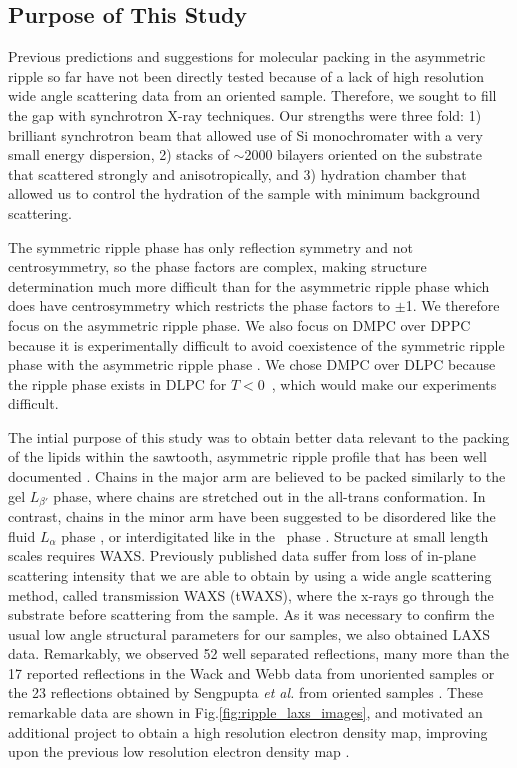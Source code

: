 \subsection{Purpose of This Study}
Previous predictions and suggestions for molecular packing in the asymmetric
ripple so far have not been directly tested because of a lack of 
high resolution wide angle scattering data from an oriented sample.
Therefore, we sought to fill the gap
with synchrotron X-ray techniques. Our strengths were three fold: 1) brilliant
synchrotron beam that allowed use of Si monochromater with a very small
energy dispersion, 2) stacks of $\sim$2000 bilayers oriented on the substrate
that scattered strongly and anisotropically, and 3) hydration chamber that 
allowed us to control the hydration of the sample with minimum background scattering.

The symmetric ripple phase has only reflection symmetry and not centrosymmetry, 
so the phase factors are complex, making structure determination much more difficult 
than for the asymmetric ripple phase which does have centrosymmetry which restricts 
the phase factors to $\pm$1. We therefore focus on the asymmetric ripple phase.  
We also focus on DMPC over DPPC because it is experimentally difficult to avoid 
coexistence of the symmetric ripple phase with the asymmetric ripple phase
\cite{ref:Katsaras00}.
We chose DMPC over DLPC because the ripple phase exists in DLPC
for $T<0$~\textcelsius, which would make our experiments difficult.

The intial purpose of this study was to obtain better data relevant
to the packing of the lipids within the sawtooth, asymmetric ripple profile 
that has been well documented \cite{ref:Sun96,ref:Sengupta03}.
Chains in the major arm are believed to be packed similarly to the gel $L_{\beta'}$ phase,
where chains are stretched out in the all-trans conformation. 
In contrast, chains in the minor arm have been suggested to be disordered
like the fluid $L_\alpha$ phase \cite{ref:Wittebort81,ref:Schneider83,ref:Cunningham98,ref:Riske09}, 
or interdigitated like in the \LI\ phase \cite{ref:deVries05,ref:Lenz07}. 
Structure at small length scales requires WAXS.  
Previously published data \cite{ref:Katsaras95} suffer from loss 
of in-plane scattering intensity that we are able to obtain by using a wide 
angle scattering method, called  transmission WAXS (\acs{tWAXS}), where the x-rays 
go through the substrate before scattering from the sample.  As it was 
necessary to confirm the usual low angle structural parameters for our 
samples, we also obtained LAXS data. Remarkably, we observed 52 well 
separated reflections, many more than the 17 reported reflections 
in the Wack and Webb data from unoriented samples
\cite{ref:Wack89} or the 23 reflections obtained by Sengpupta \textit{et al.}
from oriented samples \cite{ref:Sengupta99}.  
These remarkable data are shown in Fig.\ref{fig:ripple_laxs_images}, and 
motivated an additional project to obtain a high resolution electron density map, 
improving upon the previous low resolution electron density map \cite{ref:Sun96}.

